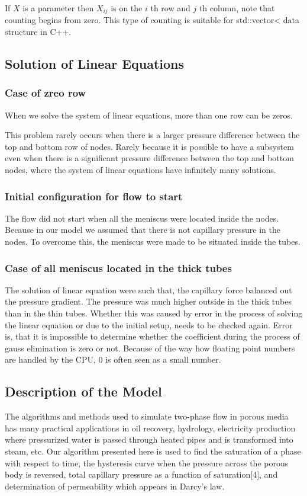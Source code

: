 	If $X$ is a parameter then $X_{ij}$ is on the $i$ th row and $j$ th column, note that counting begins from zero. This type of counting is suitable for std::vector< data structure in C++. 
	
\subsection{Solution of Linear Equations}

	\subsubsection{Case of zreo row}
	When we solve the system of linear equations, more than one row can be zeros.

	This problem rarely occurs when there is a larger pressure difference between the top and bottom row of nodes. Rarely because it is possible to have a subsystem even when there is a significant pressure difference between the top and bottom nodes, where the system of linear equations have infinitely many solutions. 


	\subsubsection{Initial configuration for flow to start}

	The flow did not start when all the meniscus were located inside the nodes. Because in our model we assumed that there is not capillary pressure in the nodes. To overcome this, the meniscus were made to be situated inside the tubes.

	\subsubsection{Case of all meniscus located in the thick tubes}

	The solution of linear equation were such that, the capillary force balanced out the pressure gradient. The pressure was much higher outside in the thick tubes than in the thin tubes. Whether this was caused by error in the process of solving the linear equation or due to the initial setup, needs to be checked again. Error is, that it is impossible to determine whether the coefficient during the process of gauss elimination is zero or not. Because of the way how floating point numbers are handled by the CPU, 0 is often seen as a small number.

\subsection{Description of the Model}
	The algorithms and methods used to simulate two-phase flow in porous media has many practical applications in oil recovery, hydrology, electricity production where pressurized water is passed through heated pipes and is transformed into steam, etc. Our algorithm presented here is used to find the saturation of a phase with respect to time, the hysteresis curve when the pressure across the porous body is reversed, total capillary pressure as a function of saturation[4], and determination of permeability which appears in Darcy’s law.

